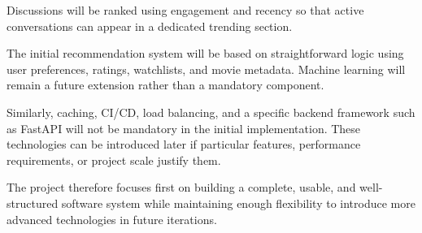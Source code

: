 \documentclass[11pt,a4paper]{article}
\begin{document}
Discussions will be ranked using engagement and recency so that active conversations can appear in a dedicated trending section.

The initial recommendation system will be based on straightforward logic using user preferences, ratings, watchlists, and movie metadata. Machine learning will remain a future extension rather than a mandatory component.

Similarly, caching, CI/CD, load balancing, and a specific backend framework such as FastAPI will not be mandatory in the initial implementation. These technologies can be introduced later if particular features, performance requirements, or project scale justify them.

The project therefore focuses first on building a complete, usable, and well-structured software system while maintaining enough flexibility to introduce more advanced technologies in future iterations.
\end{document}
